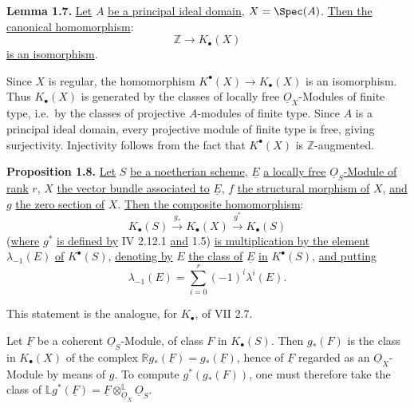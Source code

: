 %
\textbf{Lemma 1.7.} \uline{Let} $A$ \uline{be a principal ideal domain}, $X=\Spec(A)$. \uline{Then the canonical homomorphism}:
\[
\mathbb Z\longrightarrow K_\bullet(X)
\]
\uline{is an isomorphism}.

Since $X$ is regular, the homomorphism $K^{\bullet}(X)\to K_\bullet(X)$ is an isomorphism. Thus $K_\bullet(X)$ is generated by the classes of locally free $\underline{O}_X$-Modules of finite type, i.e.\ by the classes of projective $A$-modules of finite type. Since $A$ is a principal ideal domain, every projective module of finite type is free, giving surjectivity. Injectivity follows from the fact that $K^{\bullet}(X)$ is $\mathbb Z$-augmented.

\textbf{Proposition 1.8.} \uline{Let} $S$ \uline{be a noetherian scheme}, $\underline{E}$ \uline{a locally free} $\underline{O}_S$\uline{-Module of rank} $r$, $X$ \uline{the vector bundle associated to} $\underline{E}$, $f$ \uline{the structural morphism of} $X$, \uline{and} $g$ \uline{the zero section of} $X$. \uline{Then the composite homomorphism}:
\[
K_\bullet(S)\xrightarrow{g_*}K_\bullet(X)\xrightarrow{g^*}K_\bullet(S)
\]
(\uline{where} $g^*$ \uline{is defined by} IV 2.12.1 \uline{and} 1.5) \uline{is multiplication by the element} $\lambda_{-1}(E)$ \uline{of} $K^{\bullet}(S)$, \uline{denoting by} $E$ \uline{the class of} $\underline{E}$ \uline{in} $K^{\bullet}(S)$, \uline{and putting}
\[
\lambda_{-1}(E)=\sum_{i=0}^r(-1)^i\lambda^i(E).
\]

This statement is the analogue, for $K_\bullet$, of VII 2.7.

Let $\underline{F}$ be a coherent $\underline{O}_S$-Module, of class $F$ in $K_\bullet(S)$. Then $g_*(F)$ is the class in $K_\bullet(X)$ of the complex $\mathbb Rg_*(\underline{F})=g_*(\underline{F})$, hence of $\underline{F}$ regarded as an $\underline{O}_X$-Module by means of $g$. To compute $g^*(g_*(F))$, one must therefore take the class of \(\mathbb Lg^*(\underline{F})=\underline{F}\otimes^{\mathbb L}_{\underline{O}_X}\underline{O}_S\).

